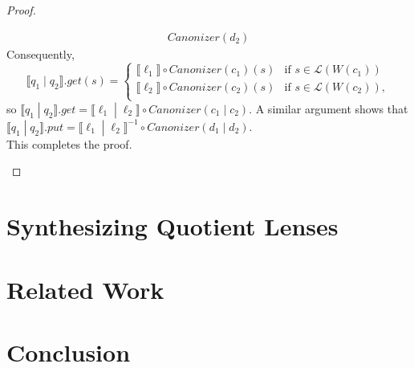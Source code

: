\documentclass{svproc}
\begin{document}
\begin{proof}
\begin{enumerate}
\begin{align*}
Canonizer(d_2)
\end{align*}
Consequently,
$$
  \llbracket q_1 \; | \; q_2 \rrbracket.get(s) = 
  \begin{cases}
  \llbracket \ell_1 \rrbracket \circ
Canonizer(c_1) (s) & \text{if } s \in \mathcal{L}(W(c_1))\\
  \llbracket \ell_2 \rrbracket \circ
Canonizer(c_2) (s) & \text{if } s \in \mathcal{L}(W(c_2)),\\
  \end{cases}$$
  so $\llbracket q_1 \; | \; q_2 \rrbracket.get = \llbracket \ell_1 \; | \;
  \ell_2 \rrbracket \circ Canonizer(c_1 \; | \; c_2)$. A similar argument shows
  that $\llbracket q_1 \; | \; q_2 \rrbracket.put = \llbracket \ell_1 \; | \;
  \ell_2 \rrbracket^{-1} \circ Canonizer(d_1 \; | \; d_2)$.\\
  This completes the proof.
\end{enumerate}
\end{proof}
\section{Synthesizing Quotient Lenses}
\section{Related Work}

\section{Conclusion}
\end{document}
